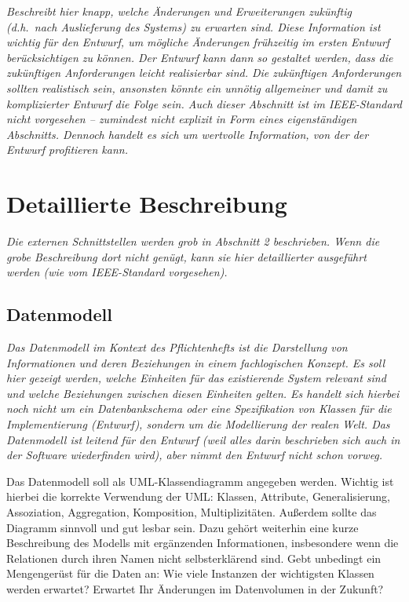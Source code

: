 \documentclass[fontsize=12pt,paper=a4,twoside]{scrartcl}
\begin{document}
  {\em Beschreibt hier knapp, welche Änderungen und Erweiterungen
  zukünftig (d.h.\ nach Auslieferung des Systems) zu erwarten sind.
  Diese Information ist wichtig für den Entwurf, um mögliche
  Änderungen frühzeitig im ersten Entwurf berücksichtigen zu können.
  Der Entwurf kann dann so gestaltet werden, dass die zukünftigen
  Anforderungen leicht realisierbar sind. Die zukünftigen
  Anforderungen sollten realistisch sein, ansonsten könnte ein unnötig
  allgemeiner und damit zu komplizierter Entwurf die Folge sein.  Auch
  dieser Abschnitt ist im IEEE-Standard nicht vorgesehen -- zumindest
  nicht explizit in Form eines eigenständigen Abschnitts. Dennoch
  handelt es sich um wertvolle Information, von der der Entwurf
  profitieren kann.}
  

\section{Detaillierte Beschreibung}
\label{ch:DetaillierteBeschreibung}
{\em Die externen Schnittstellen werden grob in Abschnitt 2
  beschrieben.  Wenn die grobe Beschreibung dort nicht genügt, kann
  sie hier detaillierter ausgeführt werden (wie vom IEEE-Standard
  vorgesehen).}

\subsection{Datenmodell}
  {\em Das Datenmodell im Kontext des Pflichtenhefts ist {\glqq}die
  Darstellung von Informationen und deren Beziehungen in einem
  fachlogischen Konzept{\grqq}. Es soll hier gezeigt werden, welche
  Einheiten für das existierende System relevant sind und welche
  Beziehungen zwischen diesen Einheiten gelten. Es handelt sich
  hierbei noch nicht um ein Datenbankschema oder eine Spezifikation
  von Klassen für die Implementierung (Entwurf), sondern um die
  Modellierung der realen Welt. Das Datenmodell ist leitend für den
  Entwurf (weil alles darin beschrieben sich auch in der Software 
  wiederfinden wird), aber nimmt den Entwurf nicht schon vorweg.
  
  Das Datenmodell soll als UML-Klassendiagramm angegeben werden.
  Wichtig ist hierbei die korrekte Verwendung der UML: Klassen,
  Attribute, Generalisierung, Assoziation, Aggregation, Komposition,
  Multiplizitäten. Außerdem sollte das Diagramm sinnvoll und gut
  lesbar sein. Dazu gehört weiterhin eine kurze Beschreibung des
  Modells mit ergänzenden Informationen, insbesondere wenn die
  Relationen durch ihren Namen nicht selbsterklärend sind. Gebt
  unbedingt ein Mengengerüst für die Daten an: Wie viele Instanzen der
  wichtigsten Klassen werden erwartet? Erwartet Ihr Änderungen im
  Datenvolumen in der Zukunft?}
\end{document}

